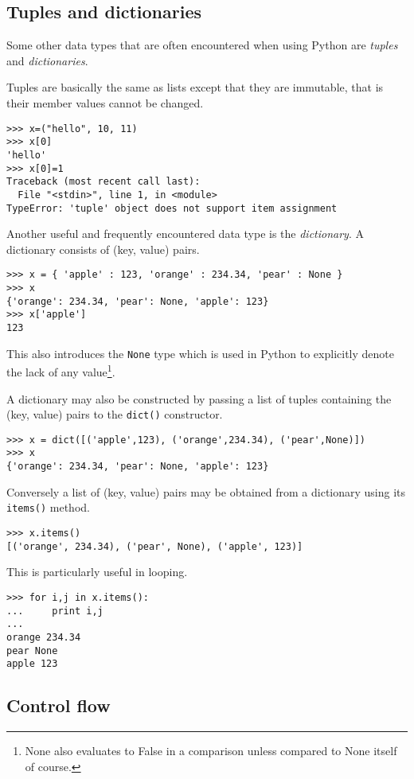 \documentclass[10pt,a4paper]{article}
\begin{document}
\subsection{Tuples and dictionaries}
Some other data types that are often encountered when using Python are \emph{tuples} and \emph{dictionaries}.

Tuples are basically the same as lists except that they are immutable, that is their member values cannot be changed.
\begin{lstlisting}
>>> x=("hello", 10, 11)
>>> x[0]
'hello'
>>> x[0]=1
Traceback (most recent call last):
  File "<stdin>", line 1, in <module>
TypeError: 'tuple' object does not support item assignment
\end{lstlisting}
Another useful and frequently encountered data type is the \emph{dictionary}.
A dictionary consists of (key, value) pairs.
\begin{lstlisting}
>>> x = { 'apple' : 123, 'orange' : 234.34, 'pear' : None }
>>> x
{'orange': 234.34, 'pear': None, 'apple': 123}
>>> x['apple']
123
\end{lstlisting}
This also introduces the \verb|None| type which is used in Python to explicitly denote the lack of any value\footnote{None also evaluates to False in a comparison unless compared to None itself of course.}.

A dictionary may also be constructed by passing a list of tuples containing the (key, value) pairs to the \verb|dict()| constructor.
\begin{lstlisting}
>>> x = dict([('apple',123), ('orange',234.34), ('pear',None)])
>>> x
{'orange': 234.34, 'pear': None, 'apple': 123}
\end{lstlisting}
Conversely a list of (key, value) pairs may be obtained from a dictionary using its \verb|items()| method.
\begin{lstlisting}
>>> x.items()
[('orange', 234.34), ('pear', None), ('apple', 123)]
\end{lstlisting}
This is particularly useful in looping.
\begin{lstlisting}
>>> for i,j in x.items():
...     print i,j
... 
orange 234.34
pear None
apple 123
\end{lstlisting}

\subsection{Control flow}
\end{document}
